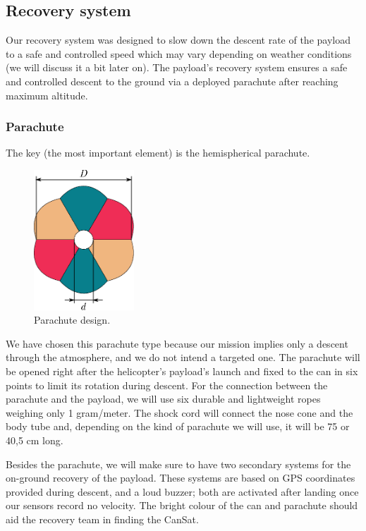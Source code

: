 
\subsection{Recovery system}
Our recovery system was designed to slow down the descent rate of the payload to a safe and controlled speed which may vary depending on weather conditions (we will discuss it a bit later on). The payload’s recovery system ensures a safe and controlled descent to the ground via a deployed parachute after reaching maximum altitude.

\subsubsection{Parachute}

The key (the most important element) is the hemispherical parachute. 
\begin{figure}
    \centering
    \includegraphics[width=3.75cm]{images/img_canopy2.eps}
    \caption{\small{Parachute design.}}
    \label{fig:software_fiagram}
\end{figure}
We have chosen this parachute type because our mission implies only a descent through the atmosphere, and we do not intend a targeted one. The parachute will be opened right after the helicopter’s payload’s launch and fixed to the can in six points to limit its rotation during descent. For the connection between the parachute and the payload, we will use six durable and lightweight ropes weighing only 1 gram/meter. The shock cord will connect the nose cone and the body tube and, depending on the kind of parachute we will use, it will be 75 or 40,5 cm long. 

Besides the parachute, we will make sure to have two secondary systems for the on-ground recovery of the payload. These systems are based on GPS coordinates provided during descent, and a loud buzzer; both are activated after landing once our sensors record no velocity. The bright colour of the can and parachute should aid the recovery team in finding the CanSat.      

